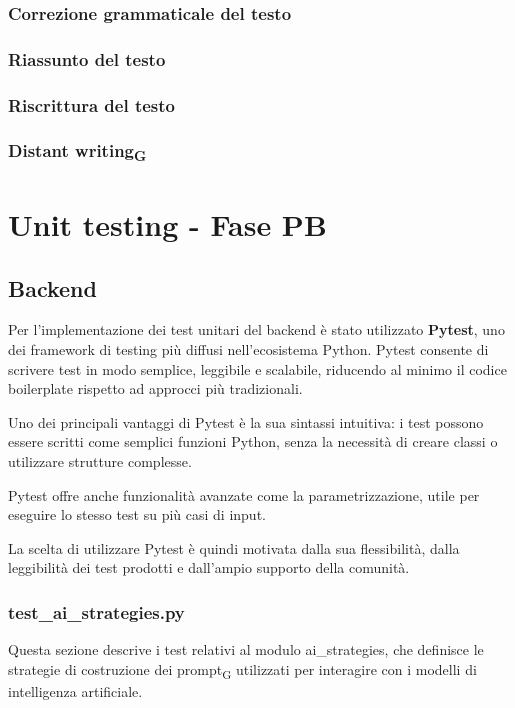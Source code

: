 \documentclass[11pt,a4paper]{article}
\newcommand{\gls}[1]{#1\textsubscript{G}}
\begin{document}
\subsubsection{Correzione grammaticale del testo}
\subsubsection{Riassunto del testo}
\subsubsection{Riscrittura del testo}
\subsubsection{\gls{Distant writing}}

\newpage

\section{Unit testing - Fase PB}

\subsection{Backend}
Per l’implementazione dei test unitari del backend è stato utilizzato \textbf{Pytest}, uno dei framework di testing più diffusi nell’ecosistema Python. Pytest consente di scrivere test in modo semplice, leggibile e scalabile, riducendo al minimo il codice boilerplate rispetto ad approcci più tradizionali.

Uno dei principali vantaggi di Pytest è la sua sintassi intuitiva: i test possono essere scritti come semplici funzioni Python, senza la necessità di creare classi o utilizzare strutture complesse.

Pytest offre anche funzionalità avanzate come la parametrizzazione, utile per eseguire lo stesso test su più casi di input.

La scelta di utilizzare Pytest è quindi motivata dalla sua flessibilità, dalla leggibilità dei test prodotti e dall’ampio supporto della comunità.

\newcommand{\prossimoUT}{UT-\arabic{codiceUT}\stepcounter{codiceUT}}

\subsubsection{test\_ai\_strategies.py}
Questa sezione descrive i test relativi al modulo ai\_strategies, che definisce le strategie di costruzione dei \gls{prompt} utilizzati per interagire con i modelli di intelligenza artificiale.
\end{document}
